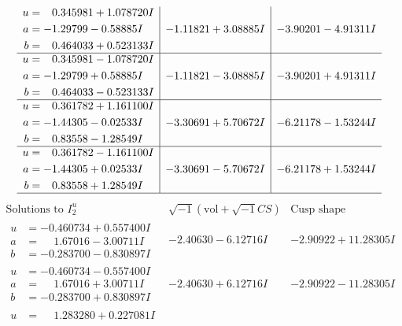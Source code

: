 \documentclass[1p]{elsarticle_modified}
\theoremstyle{definition}
\newcommand{\I}{\sqrt{-1}}
\begin{document}
$$\begin{array}{c|c|c}
\begin{aligned}
u &= \phantom{-}0.345981 + 1.078720 I \\
a &= -1.29799 - 0.58885 I \\
b &= \phantom{-}0.464033 + 0.523133 I\end{aligned}
 & -1.11821 + 3.08885 I & -3.90201 - 4.91311 I \\ \hline\begin{aligned}
u &= \phantom{-}0.345981 - 1.078720 I \\
a &= -1.29799 + 0.58885 I \\
b &= \phantom{-}0.464033 - 0.523133 I\end{aligned}
 & -1.11821 - 3.08885 I & -3.90201 + 4.91311 I \\ \hline\begin{aligned}
u &= \phantom{-}0.361782 + 1.161100 I \\
a &= -1.44305 - 0.02533 I \\
b &= \phantom{-}0.83558 - 1.28549 I\end{aligned}
 & -3.30691 + 5.70672 I & -6.21178 - 1.53244 I \\ \hline\begin{aligned}
u &= \phantom{-}0.361782 - 1.161100 I \\
a &= -1.44305 + 0.02533 I \\
b &= \phantom{-}0.83558 + 1.28549 I\end{aligned}
 & -3.30691 - 5.70672 I & -6.21178 + 1.53244 I\\
 \hline 
 \end{array}$$\newpage$$\begin{array}{c|c|c}  
\text{Solutions to }I^u_{2}& \I (\text{vol} + \sqrt{-1}CS) & \text{Cusp shape}\\
 \hline 
\begin{aligned}
u &= -0.460734 + 0.557400 I \\
a &= \phantom{-}1.67016 - 3.00711 I \\
b &= -0.283700 - 0.830897 I\end{aligned}
 & -2.40630 - 6.12716 I & -2.90922 + 11.28305 I \\ \hline\begin{aligned}
u &= -0.460734 - 0.557400 I \\
a &= \phantom{-}1.67016 + 3.00711 I \\
b &= -0.283700 + 0.830897 I\end{aligned}
 & -2.40630 + 6.12716 I & -2.90922 - 11.28305 I \\ \hline\begin{aligned}
u &= \phantom{-}1.283280 + 0.227081 I \\

\end{aligned}
\end{array}$$
\end{document}
